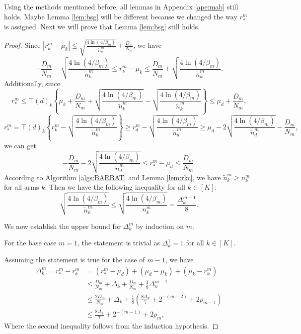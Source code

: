 Using the methods mentioned before, all lemmas in Appendix \ref{ape:mab} still holds. Maybe Lemma \ref{lem:bsg} will be different because we changed the way $r_{*}^m$ is assigned. Next we will prove that Lemma \ref{lem:bsg} still holds.
\begin{proof}
    Since $|r_k^m - \mu_k| \leq \sqrt{\frac{4\ln(4 /\beta_m)}{\widetilde{n}_k^m}} + \frac{D_m}{N_m}$, we have
    \[-\frac{D_m}{N_m} - \sqrt{\frac{4\ln(4 /\beta_m)}{\widetilde{n}_k^m}} \leq r_{k}^m - \mu_{k} \leq \frac{D_m}{N_m} + \sqrt{\frac{4\ln(4 /\beta_m)}{\widetilde{n}_k^m}}.\]
    Additionally, since
    \[r_{*}^m \leq \top(d)_{k}\left\{\mu_{k} + \frac{D_m}{N_m} + \sqrt{\frac{4\ln(4 /\beta_m)}{\widetilde{n}_k^m}} - \sqrt{\frac{4\ln(4 /\beta_m)}{\widetilde{n}_k^m}}\right\} \leq \mu_{d} + \frac{D_m}{N_m},\]
    \[r_{*}^m = \top(d)_{k} \left\{r_k^m - \sqrt{\frac{4\ln(4 /\beta_m)}{\widetilde{n}_k^m}}\right\} \geq r_{d}^m - \sqrt{\frac{4\ln(4 /\beta_m)}{\widetilde{n}_{d}^m}} \geq \mu_{d} - 2\sqrt{\frac{4\ln(4 /\beta_m)}{\widetilde{n}_{d}^m}} - \frac{D_m}{N_m},\]
    we can get
    \[-\frac{D_m}{N_m} - 2\sqrt{\frac{4\ln(4 /\beta_m)}{\widetilde{n}_{d}^m}} \leq r_{*}^m - \mu_{d} \leq \frac{D_m}{N_m}.\]
    According to Algorithm \ref{algs:BARBAT} and Lemma \ref{lem:rkc}, we have $\widetilde{n}_k^m \geq n_k^m$ for all arms $k$. Then we have the following inequality for all $k\in [K]$:
    \[\sqrt{\frac{4\ln(4 /\beta_m)}{\widetilde{n}_k^m}} \leq \sqrt{\frac{4\ln(4 /\beta_m)}{n_k^m}} = \frac{\Delta_k^{m-1}}{8}.\]

    We now establish the upper bound for $\Delta_k^m$ by induction on $m$.
    
    For the base case $m = 1$, the statement is trivial as $\Delta_k^1 = 1$ for all $k \in [K]$.
    
    Assuming the statement is true for the case of $m-1$, we have
    \begin{equation*}
    \begin{split}
        \Delta_k^m = r_*^m - r_k^m
        &= (r_*^m - \mu_{d}) + (\mu_{d} - \mu_k) + (\mu_k - r_k^m) \\
        &\leq \frac{D_m}{N_m}+ \Delta_k + \frac{D_m}{N_m} + \frac{1}{8}\Delta_k^{m-1} \\
        &\leq \frac{2D_m}{N_m} + \Delta_k + \frac{1}{8}\left(\frac{8 \Delta_k}{7} + 2^{-(m-2)} + 2\rho_{m-1}\right) \\
        &\leq \frac{8 \Delta_k}{7} + 2^{-(m-1)} + 2\rho_m,
    \end{split}
    \end{equation*}
    Where the second inequality follows from the induction hypothesis.
     

\end{proof}
